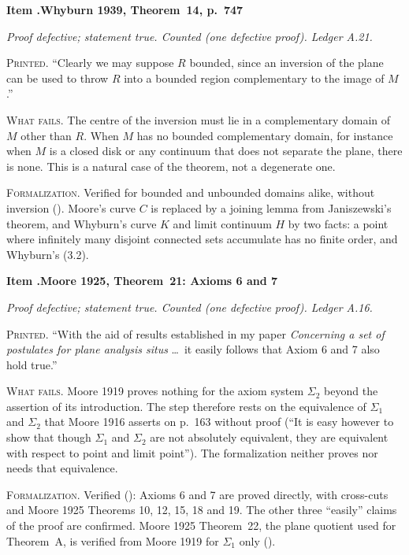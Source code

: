 \documentclass[11pt]{article}
\newcounter{defect}
\newenvironment{defect}[4]{%
  \par\addvspace{10pt}\refstepcounter{defect}%
  \noindent\textbf{Item \thedefect.\enspace #1}\par\nopagebreak
  \noindent\textit{#2}\par\nopagebreak\smallskip}{\par\addvspace{6pt}}
\newcommand{\fld}[1]{\par\noindent\textsc{#1.}\enspace}
\begin{document}
\begin{defect}{Whyburn 1939, Theorem~14, p.~747}{Proof defective; statement true. Counted (one
defective proof). Ledger A.21.}{0}{1}\label{it:w39}

\fld{Printed} ``Clearly we may suppose $R$ bounded, since an inversion of the plane can be used to
throw $R$ into a bounded region complementary to the image of $M$.''

\fld{What fails} The centre of the inversion must lie in a complementary domain of $M$ other than
$R$. When $M$ has no bounded complementary domain, for instance when $M$ is a closed disk or any
continuum that does not separate the plane, there is none. This is a natural case of the theorem,
not a degenerate one.

\fld{Formalization} Verified for bounded and unbounded domains alike, without inversion
(). Moore's curve $C$ is replaced by a joining lemma from Janiszewski's
theorem, and Whyburn's curve $K$ and limit continuum $H$ by two facts: a point where infinitely
many disjoint connected sets accumulate has no finite order, and Whyburn's (3.2).
\end{defect}

\begin{defect}{Moore 1925, Theorem~21: Axioms 6 and 7}{Proof defective; statement true. Counted (one
defective proof). Ledger A.16.}{0}{1}\label{it:m25-21}

\fld{Printed} ``With the aid of results established in my paper \emph{Concerning a set of
postulates for plane analysis situs} \ldots\ it easily follows that Axiom 6 and 7 also hold true.''

\fld{What fails} Moore 1919 proves nothing for the axiom system $\Sigma_2$ beyond the assertion of
its introduction. The step therefore rests on the equivalence of $\Sigma_1$ and $\Sigma_2$ that
Moore 1916 asserts on p.~163 without proof (``It is easy however to show that though $\Sigma_1$
and $\Sigma_2$ are not absolutely equivalent, they are equivalent with respect to point and limit
point''). The formalization neither proves nor needs that equivalence.

\fld{Formalization} Verified (): Axioms 6 and 7 are proved directly, with
cross-cuts and Moore 1925 Theorems 10, 12, 15, 18 and 19. The other three ``easily'' claims of the
proof are confirmed. Moore 1925 Theorem~22, the plane quotient used for Theorem~A, is verified from
Moore 1919 for $\Sigma_1$ only ().
\end{defect}
\end{document}
